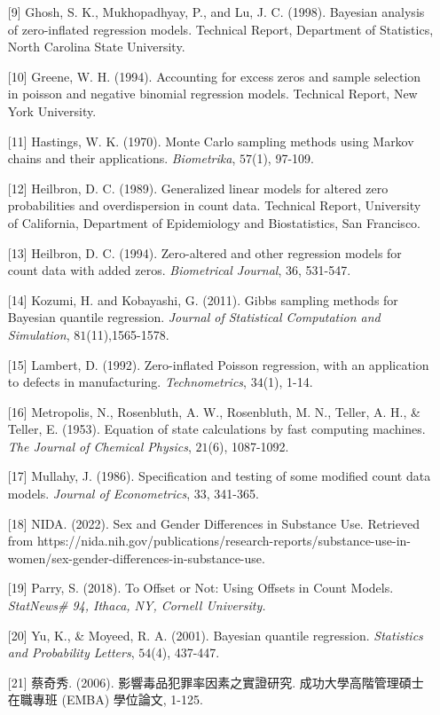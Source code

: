 \documentclass[12pt,a4paper]{article}
\begin{document}
\begin{CJK}{UTF8}{bkai}
\begin{enumerate}
\item[{[9]}] Ghosh, S. K., Mukhopadhyay, P., and Lu, J. C. (1998). Bayesian analysis of zero-inflated regression models. Technical Report, Department of Statistics, North Carolina State University.
\item[{[10]}] Greene, W. H. (1994). Accounting for excess zeros and sample selection in poisson and negative binomial regression models.  Technical Report, New York University.
\item[{[11]}] Hastings, W. K. (1970). Monte Carlo sampling methods using Markov chains and their applications. \emph{Biometrika}, $\mathit{57}$(1), 97-109.
\item[{[12]}] Heilbron, D. C. (1989). Generalized linear models for altered zero probabilities and overdispersion in count data. Technical Report, University of California, Department of Epidemiology and Biostatistics, San Francisco.
\item[{[13]}] Heilbron, D. C. (1994). Zero-altered and other regression models for count data with added zeros. \emph{Biometrical Journal}, $\mathit{36}$, 531-547.
\item[{[14]}] Kozumi, H. and Kobayashi, G. (2011). Gibbs sampling methods for Bayesian quantile regression. \emph{Journal of Statistical Computation and Simulation}, $\mathit{81}$(11),1565-1578.
\item[{[15]}] Lambert, D. (1992). Zero-inflated Poisson regression, with an application to defects in manufacturing. \emph{Technometrics}, $\mathit{34}$(1), 1-14.
\item[{[16]}] Metropolis, N., Rosenbluth, A. W., Rosenbluth, M. N., Teller, A. H., \& Teller, E. (1953). Equation of state calculations by fast computing machines. \emph{The Journal of Chemical Physics}, $\mathit{21}$(6), 1087-1092.
\item[{[17]}] Mullahy, J. (1986). Specification and testing of some modified count data models. \emph{Journal of Econometrics}, $\mathit{33}$, 341-365.
\item[{[18]}] NIDA. (2022). Sex and Gender Differences in Substance Use. Retrieved from https://nida.nih.gov/publications/research-reports/substance-use-in-women/sex-gender-differences-in-substance-use.
\item[{[19]}] Parry, S. (2018). To Offset or Not: Using Offsets in Count Models. \emph{StatNews\# 94, Ithaca, NY, Cornell University.}
\item[{[20]}] Yu, K., \& Moyeed, R. A. (2001). Bayesian quantile regression. \emph{Statistics and Probability Letters}, $\mathit{54}$(4), 437-447.
\item[{[21]}] 蔡奇秀. (2006). 影響毒品犯罪率因素之實證研究. 成功大學高階管理碩士在職專班 (EMBA) 學位論文, 1-125.
\end{enumerate}


\end{CJK}
\end{document}
